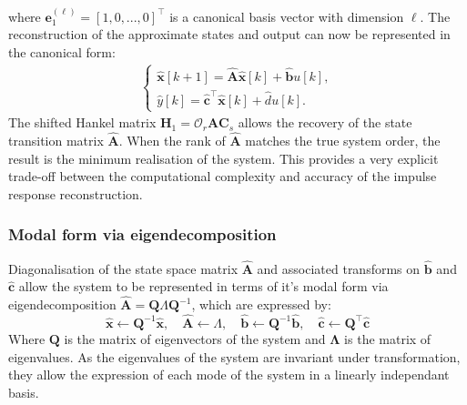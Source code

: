 where $\mathbf{e}_{1}^{(\ell)} = [1, 0, ..., 0]^{\top}$ is a canonical basis vector with dimension $\ell$. The reconstruction of the approximate states and output can now be represented in the canonical form:
\begin{align}
\label{eq:output}
\begin{cases}
    \hat{\mathbf{x}}[k+1] = \hat{\mathbf{A}} \hat{\mathbf{x}} [k] + \hat{\mathbf{b}} u[k], \\
    \hat{y} [k] = \hat{\mathbf{c}}^{\top} \hat{\mathbf{x}} [k] + \hat{d} u[k].
\end{cases}
\end{align}
The shifted Hankel matrix $\mathbf{H}_1 = \mathcal{O}_r \mathbf{A} \mathbf{C}_s$ allows the recovery of the state transition matrix $\hat{\mathbf{A}}$. When the rank of $\hat{\mathbf{A}}$ matches the true system order, the result is the minimum realisation of the system. This provides a very explicit trade-off between the computational complexity and accuracy of the impulse response reconstruction.

\subsubsection{Modal form via eigendecomposition}
Diagonalisation of the state space matrix $\hat{\mathbf{A}}$ and associated transforms on $\hat{\mathbf{b}}$ and $\hat{\mathbf{c}}$ allow the system to be represented in terms of it's modal form via eigendecomposition $\hat{\mathbf{A}} = \mathbf{Q} \Lambda \mathbf{Q}^{-1}$, which are expressed by:
\begin{equation}
\label{eq:coord}
    \hat{\mathbf{x}}       \leftarrow \mathbf{Q}^{-1}\mathbf{\hat{x}},
    \quad \hat{\mathbf{A}} \leftarrow \Lambda,
    \quad \hat{\mathbf{b}} \leftarrow \mathbf{Q}^{-1} \hat{\mathbf{b}},
    \quad \hat{\mathbf{c}} \leftarrow \mathbf{Q}^{\top} \hat{\mathbf{c}}
\end{equation}
Where $\mathbf{Q}$ is the matrix of eigenvectors of the system and $\mathbf{\Lambda}$ is the matrix of eigenvalues. As the eigenvalues of the system are invariant under transformation, they allow the expression of each mode of the system in a linearly independant basis.

